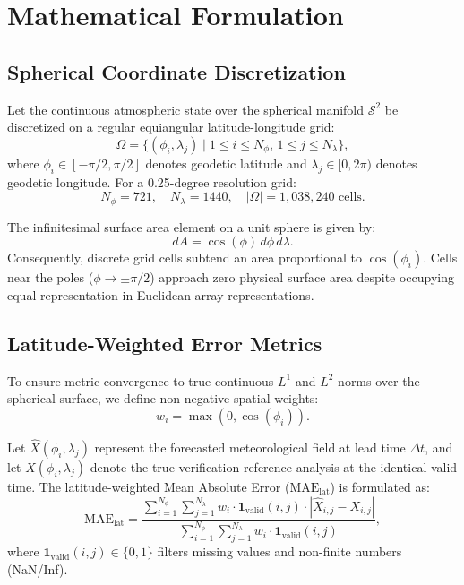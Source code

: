 \documentclass[10pt,journal,compsoc]{IEEEtran}
\begin{document}
\section{Mathematical Formulation}

\subsection{Spherical Coordinate Discretization}
Let the continuous atmospheric state over the spherical manifold $\mathcal{S}^2$ be discretized on a regular equiangular latitude-longitude grid:
\begin{equation}
    \Omega = \{ (\phi_i, \lambda_j) \mid 1 \leq i \leq N_\phi, \, 1 \leq j \leq N_\lambda \},
\end{equation}
where $\phi_i \in [-\pi/2, \pi/2]$ denotes geodetic latitude and $\lambda_j \in [0, 2\pi)$ denotes geodetic longitude. For a 0.25-degree resolution grid:
\begin{equation}
    N_\phi = 721, \quad N_\lambda = 1440, \quad |\Omega| = 1,038,240 \text{ cells}.
\end{equation}

The infinitesimal surface area element on a unit sphere is given by:
\begin{equation}
    dA = \cos(\phi) \, d\phi \, d\lambda.
\end{equation}
Consequently, discrete grid cells subtend an area proportional to $\cos(\phi_i)$. Cells near the poles ($\phi \to \pm \pi/2$) approach zero physical surface area despite occupying equal representation in Euclidean array representations.

\subsection{Latitude-Weighted Error Metrics}
To ensure metric convergence to true continuous $L^1$ and $L^2$ norms over the spherical surface, we define non-negative spatial weights:
\begin{equation}
    w_i = \max(0, \cos(\phi_i)).
\end{equation}

Let $\hat{X}(\phi_i, \lambda_j)$ represent the forecasted meteorological field at lead time $\Delta t$, and let $X(\phi_i, \lambda_j)$ denote the true verification reference analysis at the identical valid time. The latitude-weighted Mean Absolute Error ($\text{MAE}_{\text{lat}}$) is formulated as:
\begin{equation}
    \text{MAE}_{\text{lat}} = \frac{\sum_{i=1}^{N_\phi} \sum_{j=1}^{N_\lambda} w_i \cdot \mathbf{1}_{\text{valid}}(i,j) \cdot |\hat{X}_{i,j} - X_{i,j}|}{\sum_{i=1}^{N_\phi} \sum_{j=1}^{N_\lambda} w_i \cdot \mathbf{1}_{\text{valid}}(i,j)},
\end{equation}
where $\mathbf{1}_{\text{valid}}(i,j) \in \{0, 1\}$ filters missing values and non-finite numbers (NaN/Inf).
\end{document}
